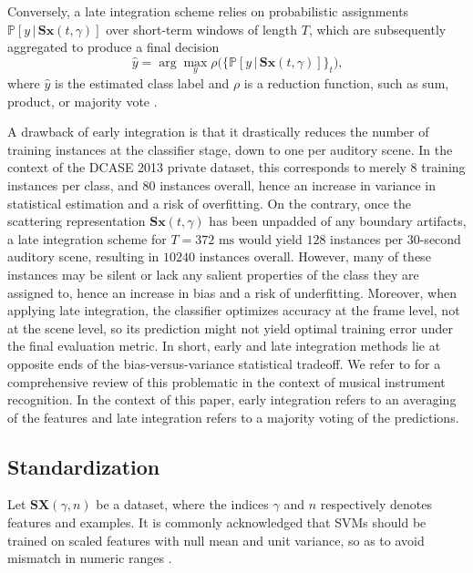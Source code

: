 \documentclass[journal]{IEEEtran}
\begin{document}
Conversely, a late integration scheme relies on probabilistic assignments $\mathbb{P}\left[y \,\vert\, \mathbf{S}\boldsymbol{x}(t,\gamma) \right]$ over short-term windows of length $T$, which are subsequently aggregated to produce a final decision
\begin{equation}
\hat{y} = \arg \max_{y} \rho\Big(\big\{ \mathbb{P}\left[y \,\vert\, \mathbf{S}\boldsymbol{x}(t,\gamma) \right] \big\}_{t} \Big)\mbox{,}
\end{equation}
where $\hat{y}$ is the estimated class label and $\rho$ is a reduction function, such as sum, product, or majority vote \cite{Kittler1998}.

A drawback of early integration is that it drastically reduces the number of training instances at the classifier stage, down to one per auditory scene.
In the context of the DCASE 2013 private dataset, this corresponds to merely $8$ training instances per class, and $80$ instances overall, hence an increase in variance in statistical estimation and a risk of overfitting.
On the contrary, once the scattering representation $\mathbf{S}\boldsymbol{x}(t,\gamma)$ has been unpadded of any boundary artifacts, a late integration scheme for $T=372\textrm{ ms}$ would yield $128$ instances per $30$-second auditory scene, resulting in $10240$ instances overall.
However, many of these instances may be silent or lack any salient properties of the class they are assigned to, hence an increase in bias and a risk of underfitting.
Moreover, when applying late integration, the classifier optimizes accuracy at the frame level, not at the scene level, so its prediction might not yield optimal training error under the final evaluation metric.
In short, early and late integration methods lie at opposite ends of the bias-versus-variance statistical tradeoff.
We refer to \cite{Joder2009} for a comprehensive review of this problematic in the context of musical instrument recognition.
In the context of this paper, early integration refers to an averaging of the features and late integration refers to a majority voting of the predictions. 

\subsection{Standardization}
\label{sec:stand}

Let $\mathbf{S}\boldsymbol{X}(\gamma,n)$ be a dataset, where the indices $\gamma$ and $n$ respectively denotes features and examples.
It is commonly acknowledged that SVMs should be trained on scaled features with null mean and unit variance, so as to avoid mismatch in numeric ranges \cite{Hsu2003}.
\end{document}
